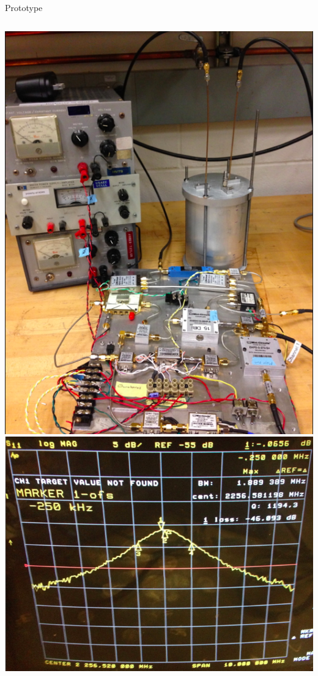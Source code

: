 \documentclass{beamer}
\begin{document}
\begin{frame}{Prototype}
\begin{columns}
\includegraphics[width=\textwidth]{active_resonator_setup_photo}
\includegraphics[width=\textwidth]{s21_no_delay}


\end{columns}
\end{frame}
\end{document}
